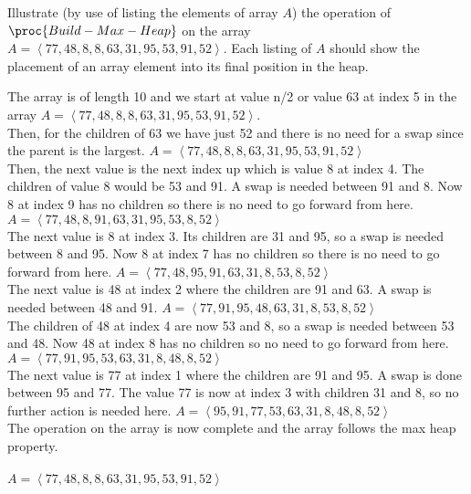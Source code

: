\documentclass[addpoints,11pt]{exam}
\begin{document}
\begin{questions}
\begin{solutionorbox}
\end{solutionorbox}

\newpage


\question[10]
Illustrate (by use of listing the elements of array $A$) the operation of $\proc{Build-Max-Heap}$ on the array $A = \left< 77, 48, 8, 8, 63, 31, 95, 53, 91, 52\right>$.  Each listing of $A$ should show the placement of an array element into its final position in the heap.
\begin{solutionorbox}
The array is of length 10 and we start at value n/2 or value 63 at index 5 in the array $A = \left< 77, 48, 8, 8, 63, 31, 95, 53, 91, 52\right>$. 
 \\ Then, for the children of 63 we have just 52 and there is no need for a swap since the parent is the largest. $A = \left< 77, 48, 8, 8, 63, 31, 95, 53, 91, 52\right>$
 \\ Then, the next value is the next index up which is value 8 at index 4. The children of value 8 would be 53 and 91. A swap is needed between 91 and 8. Now 8 at index 9 has no children so there is no need to go forward from here. $A = \left< 77, 48, 8, 91, 63, 31, 95, 53, 8, 52\right>$
 \\ The next value is 8 at index 3. Its children are 31 and 95, so a swap is needed between 8 and 95. Now 8 at index 7 has no children so there is no need to go forward from here. $A = \left< 77, 48, 95, 91, 63, 31, 8, 53, 8, 52\right>$
 \\ The next value is 48 at index 2 where the children are 91 and 63. A swap is needed between 48 and 91. $A = \left< 77, 91, 95, 48, 63, 31, 8, 53, 8, 52\right>$
 \\ The children of 48 at index 4 are now 53 and 8, so a swap is needed between 53 and 48. Now 48 at index 8 has no children so no need to go forward from here. $A = \left< 77, 91, 95, 53, 63, 31, 8, 48, 8, 52\right>$
 \\ The next value is 77 at index 1 where the children are 91 and 95. A swap is done between 95 and 77. The value 77 is now at index 3 with children 31 and 8, so no further action is needed here. $A = \left< 95, 91, 77, 53, 63, 31, 8, 48, 8, 52\right>$
 \\ The operation on the array is now complete and the array follows the max heap property. 
 \\
 \\$A = \left< 77, 48, 8, 8, 63, 31, 95, 53, 91, 52\right>$

\end{solutionorbox}
\end{questions}
\end{document}
